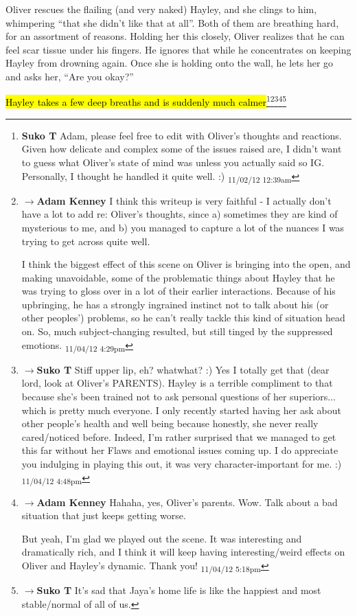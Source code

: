 Oliver rescues the flailing (and very naked) Hayley, and she clings to him, whimpering ``that she didn't like that at all''.  Both of them are breathing hard, for an assortment of reasons.  Holding her this closely, Oliver realizes that he can feel scar tissue under his fingers.  He ignores that while he concentrates on keeping Hayley from drowning again.  Once she is holding onto the wall, he lets her go and asks her, ``Are you okay?''



\hl{Hayley takes a few deep breaths and is suddenly much calmer}\footnote{\textbf{Suko T }Adam, please feel free to edit with Oliver's thoughts and reactions.  Given how delicate and complex some of the issues raised are, I didn't want to guess what Oliver's state of mind was unless you actually said so IG.  Personally, I thought he handled it quite well. :) \textsubscript{11/02/12 12:39am}}\footnote{$\rightarrow$\textbf{Adam Kenney }I think this writeup is very faithful - I actually don't have a lot to add re: Oliver's thoughts, since a) sometimes they are kind of mysterious to me, and b) you managed to capture a lot of the nuances I was trying to get across quite well.

I think the biggest effect of this scene on Oliver is bringing into the open, and making unavoidable, some of the problematic things about Hayley that he was trying to gloss over in a lot of their earlier interactions.  Because of his upbringing, he has a strongly ingrained instinct not to talk about his (or other peoples') problems, so he can't really tackle this kind of situation head on.  So, much subject-changing resulted, but still tinged by the suppressed emotions. \textsubscript{11/04/12 4:29pm}}\footnote{$\rightarrow$\textbf{Suko T }Stiff upper lip, eh?  whatwhat?  :)  Yes I totally get that (dear lord, look at Oliver's PARENTS).  Hayley is a terrible compliment to that because she's been trained not to ask personal questions of her superiors... which is pretty much everyone. I only recently started having her ask about other people's health and well being because honestly, she never really cared/noticed before.  Indeed, I'm rather surprised that we managed to get this far without her Flaws and emotional issues coming up.  I do appreciate you indulging in playing this out, it was very character-important for me. :) \textsubscript{11/04/12 4:48pm}}\footnote{$\rightarrow$\textbf{Adam Kenney }Hahaha, yes, Oliver's parents.  Wow.  Talk about a bad situation that just keeps getting worse.

But yeah, I'm glad we played out the scene.  It was interesting and dramatically rich, and I think it will keep having interesting/weird effects on Oliver and Hayley's dynamic.  Thank you! \textsubscript{11/04/12 5:18pm}}\footnote{$\rightarrow$\textbf{Suko T }It's sad that Jaya's home life is like the happiest and most stable/normal of all of us.  

}
